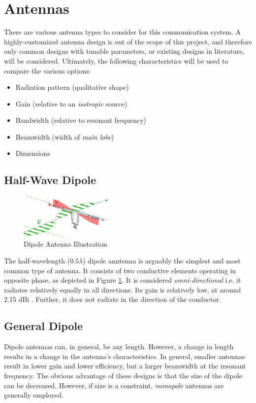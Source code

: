 \graphicspath{{./figures}}

\section{Antennas}\label{sec:antennas}

There are various antenna types to consider for this communication system. A highly-customized antenna design is out of the scope of this project, and therefore only common designs with tunable parameters, or existing designs in literature, will be considered. Ultimately, the following characteristics will be used to compare the various options:
\begin{itemize}
    \item Radiation pattern (qualitative shape)
    \item Gain (relative to an \textit{isotropic} source) 
    \item Bandwidth (relative to resonant frequency)
    \item Beamwidth (width of \textit{main lobe})
    \item Dimensions
\end{itemize}

\subsection{Half-Wave Dipole}
\begin{figure}[!htb]
  \centering
  \includegraphics[width=0.4\textwidth]{dipole}
  \caption{Dipole Antenna Illustration \cite{site-designingDipole}}
  \label{fig:dipole}
\end{figure}

The half-wavelength ($0.5 \lambda$) dipole anntenna is arguably the simplest and most common type of antenna. It consists of two conductive elements operating in opposite phase, as depicted in Figure \ref{fig:dipole}. It is considered \textit{omni-directional} i.e. it radiates relatively equally in all directions. Its gain is relatively low, at around 2.15 dBi \cite{site-antennaTheory}. Further, it does not radiate in the direction of the conductor.

\subsection{General Dipole}
Dipole antennas can, in general, be any length. However, a change in length results in a change in the antenna's characteristics. In general, smaller antennas result in lower gain and lower efficiency, but a larger beamwidth at the resonant frequency. The obvious advantage of these designs is that the size of the dipole can be decreased. However, if size is a constraint, \textit{monopole} antennas are generally employed.

